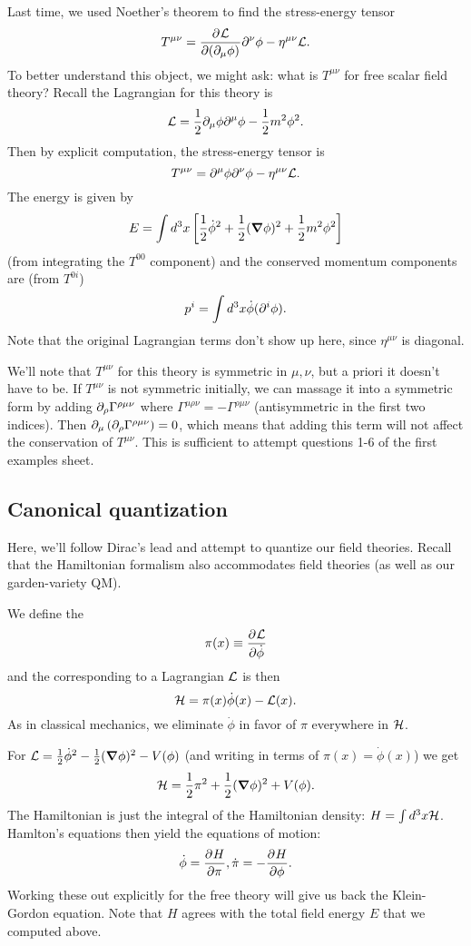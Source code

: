 Last time, we used Noether's theorem to find the stress-energy tensor
\begin{equation}
T^{\mu\nu}=\P{\cL}{(\p_\mu\phi)}\p^\nu \phi - \eta^{\mu\nu} \cL.
\end{equation}
To better understand this object, we might ask: what is $T^{\mu\nu}$ for free scalar field theory? Recall the Lagrangian for this theory is
\begin{equation}
\cL=\frac{1}{2}\p_\mu \phi \p^\mu \phi - \frac{1}{2} m^2 \phi^2.
\end{equation}
Then by explicit computation, the stress-energy tensor is
$$T^{\mu\nu}=\p^\mu \phi \p^\nu \phi - \eta^{\mu\nu} \cL.$$
The energy is given by 
$$E=\int d^3 x \left[\frac{1}{2} \dot \phi^2 +\frac{1}{2}(\grad \phi)^2 +\frac{1}{2}m^2 \phi^2 \right]$$
(from integrating the $T^{00}$ component) and the conserved momentum components are (from $T^{0i}$)
$$p^i= \int d^3x \dot \phi (\p^i \phi).$$
Note that the original Lagrangian terms don't show up here, since $\eta^{\mu\nu}$ is diagonal.

We'll note that $T^{\mu\nu}$ for this theory is symmetric in $\mu,\nu$, but a priori it doesn't have to be. If $T^{\mu\nu}$ is not symmetric initially, we can massage it into a symmetric form by adding $\p_\rho \Gamma^{\rho\mu\nu}$ where $\Gamma^{\mu\rho\nu}=-\Gamma^{\rho\mu\nu}$ (antisymmetric in the first two indices). Then $\p_\mu \left(\p_\rho \Gamma^{\rho\mu\nu}\right)=0$, which means that adding this term will not affect the conservation of $T^{\mu\nu}$. This is sufficient to attempt questions 1-6 of the first examples sheet.

\subsection*{Canonical quantization} Here, we'll follow Dirac's lead and attempt to quantize our field theories. Recall that the Hamiltonian formalism also accommodates field theories (as well as our garden-variety QM). 
\begin{defn}
We define the 
$$\pi(x)\equiv \P{\cL}{\dot \phi}$$
and the  corresponding to a Lagrangian $\cL$ is then
$$\cH=\pi(x) \dot \phi(x) - \cL(x).$$
As in classical mechanics, we eliminate $\dot\phi$ in favor of $\pi$ everywhere in $\cH$.
\end{defn}

\begin{exm}
For $\cL=\frac{1}{2}\dot \phi^2 -\frac{1}{2}(\grad \phi)^2 - V(\phi)$ (and writing in terms of $\pi(x)=\dot \phi(x)$) we get
$$\cH=\frac{1}{2}\pi^2 +\frac{1}{2}(\grad \phi)^2+ V(\phi).$$
The Hamiltonian is just the integral of the Hamiltonian density: $H=\int d^3 x \cH$. Hamlton's equations then yield the equations of motion:
$$\dot \phi = \P{H}{\pi}, \dot \pi = -\P{H}{\phi}.$$
Working these out explicitly for the free theory will give us back the Klein-Gordon equation. Note that $H$ agrees with the total field energy $E$ that we computed above.
\end{exm}

